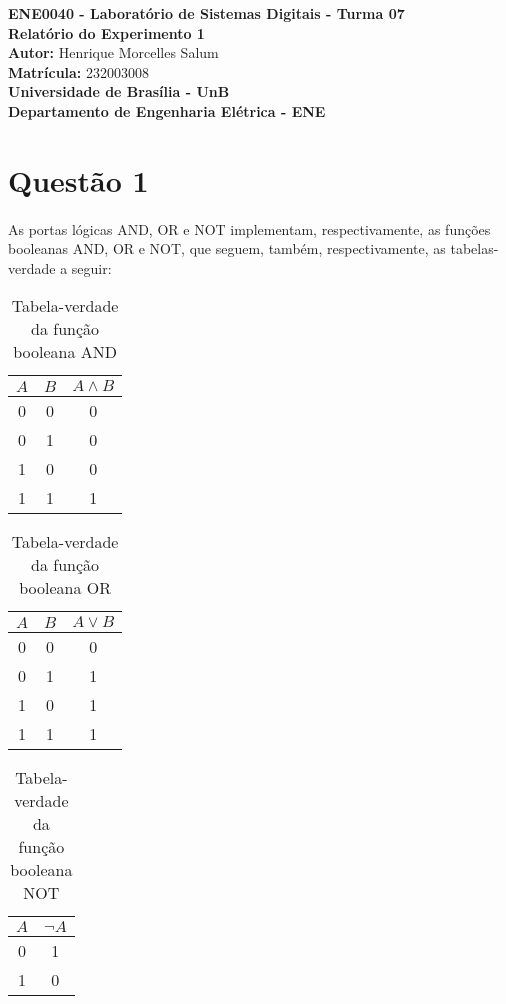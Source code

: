 \documentclass[a4paper, 12pt]{article}
\newcommand{\capa}{
    \begin{titlepage}
        \begin{center}
            {\large \textbf{ENE0040 - Laboratório de Sistemas Digitais - Turma 07}} \\
            \vspace{3cm}
            {\Huge \textbf{Relatório do Experimento 1}} \\[1em]
            {\large \textbf{Autor:} Henrique Morcelles Salum} \\[0.5em]
            {\large \textbf{Matrícula:} 232003008} \\
            \vfill
            {\Large \textbf{Universidade de Brasília - UnB}} \\[0.75em]
            {\large \textbf{Departamento de Engenharia Elétrica - ENE}} \\
        \end{center}
    \end{titlepage}
}
\begin{document}
\capa

\newpage
\tableofcontents
\newpage

\section{Questão 1}
\paragraph{}
As portas lógicas AND, OR e NOT implementam, respectivamente, as funções booleanas AND, OR e NOT, que seguem, também, respectivamente, as tabelas-verdade a seguir:

\begin{table}[H]
    \centering
    \begin{tabular}{|c|c|c|}
        \hline
        $A$ & $B$ & $A \land B$ \\ \hline
        0 & 0 & 0 \\ \hline
        0 & 1 & 0 \\ \hline
        1 & 0 & 0 \\ \hline
        1 & 1 & 1 \\ \hline
    \end{tabular}
    \caption{Tabela-verdade da função booleana AND}
\end{table}

\begin{table}[H]
    \centering
    \begin{tabular}{|c|c|c|}
        \hline
        $A$ & $B$ & $A \lor B$ \\ \hline
        0 & 0 & 0 \\ \hline
        0 & 1 & 1 \\ \hline
        1 & 0 & 1 \\ \hline
        1 & 1 & 1 \\ \hline
    \end{tabular}
    \caption{Tabela-verdade da função booleana OR}
\end{table}

\begin{table}[H]
    \centering
    \begin{tabular}{|c|c|}
        \hline
        $A$ & $\neg A$ \\ \hline
        0 & 1 \\ \hline
        1 & 0 \\ \hline
    \end{tabular}
    \caption{Tabela-verdade da função booleana NOT}
\end{table}
\end{document}
